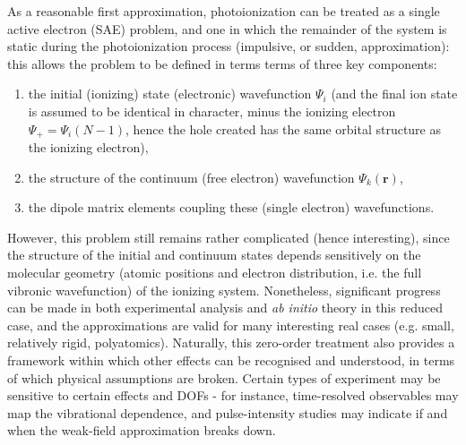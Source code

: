 \documentclass[10pt]{article}
\begin{document}
As a reasonable first approximation, photoionization can be treated as a single active electron (SAE) problem, and one in which the remainder of the system is static during the photoionization process (impulsive, or sudden, approximation): this allows the problem to be defined in terms terms of three key components: 

\begin{enumerate}
\item the initial (ionizing) state (electronic) wavefunction $\Psi_i$ (and the final ion state is assumed to be identical in character, minus the ionizing electron $\Psi_+ = \Psi_i(N-1)$, hence the hole created has the same orbital structure as the ionizing electron),
\item the structure of the continuum (free electron) wavefunction 
$\Psi_{k}(\mathbf{r})$,
\item the dipole matrix elements coupling these (single electron) wavefunctions.
\end{enumerate}


However, this problem still remains rather complicated (hence interesting), since the structure of the initial and continuum states depends sensitively on the molecular geometry (atomic positions and electron distribution, i.e. the full vibronic wavefunction) of the ionizing system. Nonetheless, significant progress can be made in both experimental analysis and \textit{ab initio} theory in this reduced case, and the approximations are valid for many interesting real cases (e.g. small, relatively rigid, polyatomics). Naturally, this zero-order treatment also provides a framework within which other effects can be recognised and understood, in terms of which physical assumptions are broken. Certain types of experiment may be sensitive to certain effects and DOFs - for instance, time-resolved observables may map the vibrational dependence, and pulse-intensity studies may indicate if and when the weak-field approximation breaks down.




\end{document}
